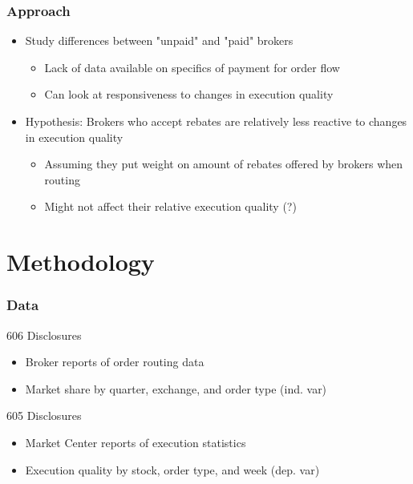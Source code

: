 \documentclass[11pt]{beamer}
\begin{document}
\begin{frame}
\frametitle{Approach}

\begin{itemize}
	\setlength\itemsep{1.5em}
	\item Study differences between "unpaid" and "paid" brokers 
	\begin{itemize}
		\setlength\itemsep{0em}
		\item Lack of data available on specifics of payment for order flow
		\item Can look at responsiveness to changes in execution quality 
	\end{itemize}
	\item Hypothesis: Brokers who accept rebates are relatively less reactive to changes in execution quality
	\begin{itemize}
		\setlength\itemsep{0em}
		\item Assuming they put weight on amount of rebates offered by brokers when routing
		\item Might not affect their relative execution quality (?)
	\end{itemize}
\end{itemize}

\end{frame}


\section{Methodology}

\begin{frame}
\frametitle{Data}

\begin{block}
	{606 Disclosures}
	\begin{itemize}
		\item Broker reports of order routing data 
		\item Market share by quarter, exchange, and order type (ind. var)
	\end{itemize}
\end{block}

\begin{block}
	{605 Disclosures}
	\begin{itemize}
		\item Market Center reports of execution statistics 
		\item Execution quality by stock, order type, and week (dep. var)
	\end{itemize}
\end{block}

\end{frame}
\end{document}
